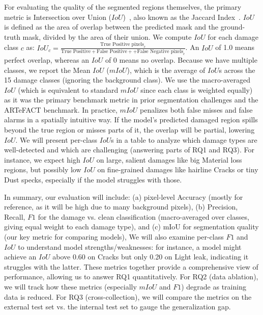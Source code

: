 \documentclass[conference]{IEEEtran}
\begin{document}
For evaluating the quality of the segmented regions themselves, the primary metric is Intersection over Union ($IoU$)~\cite{rezatofighi_generalized_2019}, also known as the Jaccard Index~\cite{jaccard_distribution_1912,murphy_finley_1996}. $IoU$ is defined as the area of overlap between the predicted mask and the ground-truth mask, divided by the area of their union. We compute $IoU$ for each damage class $c$ as: $IoU_c = \frac{\text{True Positive pixels}_c}{\text{True Positive} + \text{False Positive} + + \text{False Negative pixels}_c}$. An $IoU$ of 1.0 means perfect overlap, whereas an $IoU$ of 0 means no overlap. Because we have multiple classes, we report the Mean $IoU$ ($mIoU$), which is the average of $IoU$s across the 15 damage classes (ignoring the background class). We use the macro-averaged $IoU$ (which is equivalent to standard $mIoU$ since each class is weighted equally) as it was the primary benchmark metric in prior segmentation challenges and the ARTeFACT benchmark\cite{ivanova_artefact_2024}. In practice, $mIoU$ penalizes both false misses and false alarms in a spatially intuitive way. If the model’s predicted damaged region spills beyond the true region or misses parts of it, the overlap will be partial, lowering $IoU$. We will present per-class $IoU$s in a table to analyze which damage types are well-detected and which are challenging (answering parts of RQ1 and RQ3). For instance, we expect high $IoU$ on large, salient damages like big Material loss regions, but possibly low $IoU$ on fine-grained damages like hairline Cracks or tiny Dust specks, especially if the model struggles with those.

In summary, our evaluation will include: (a) pixel-level Accuracy (mostly for reference, as it will be high due to many background pixels), (b) Precision, Recall, $F1$ for the damage vs. clean classification (macro-averaged over classes, giving equal weight to each damage type), and (c) mIoU for segmentation quality (our key metric for comparing models), We will also examine per-class $F1$ and $IoU$ to understand model strengths/weaknesses: for instance, a model might achieve an $IoU$ above 0.60 on Cracks but only 0.20 on Light leak, indicating it struggles with the latter. These metrics together provide a comprehensive view of performance, allowing us to answer RQ1 quantitatively. For RQ2 (data ablation), we will track how these metrics (especially $mIoU$ and $F1$) degrade as training data is reduced. For RQ3 (cross-collection), we will compare the metrics on the external test set vs. the internal test set to gauge the generalization gap.
\end{document}
